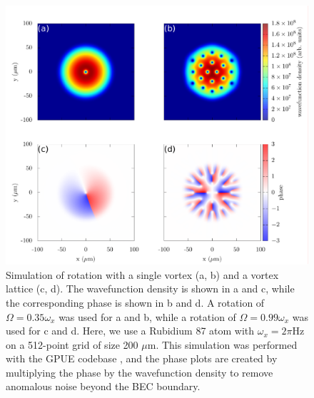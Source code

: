 \begin{figure}

\includegraphics[width=\textwidth]{data/splitop/rot/WIP.pdf}

\caption{
Simulation of rotation with a single vortex (a, b) and a vortex lattice (c, d).
The wavefunction density is shown in a and c, while the corresponding phase is shown in b and d.
A rotation of $\Omega = 0.35\omega_x$ was used for a and b, while a rotation of $\Omega = 0.99\omega_x$ was used for c and d.
Here, we use a Rubidium 87 atom with $\omega_x = 2\pi$Hz on a 512-point grid of size 200 $\mu$m.
This simulation was performed with the GPUE codebase \cite{schloss2018}, and the phase plots are created by multiplying the phase by the wavefunction density to remove anomalous noise beyond the BEC boundary.
}
\label{fig:rot}
\end{figure}

